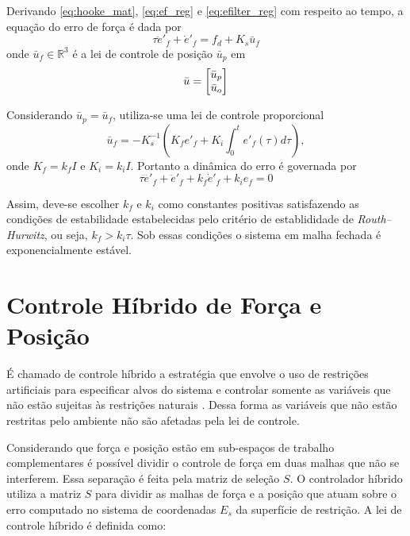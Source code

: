 Derivando \eqref{eq:hooke_mat}, \eqref{eq:ef_reg} e \eqref{eq:efilter_reg} com respeito ao tempo, a equação do erro de força é dada por 
\begin{equation}
\tau \ddot{e}'_{f} + \dot{e}'_f = {f}_d + K_s \bar{u}_f
\end{equation}
onde $\bar{u}_f \in \mathbb{R}^3$ é a lei de controle de posição $\bar{u}_p$ em
\begin{equation}
\bar{u} = \begin{bmatrix} \bar{u}_p \\ \bar{u}_o \end{bmatrix}
\end{equation}

Considerando $\bar{u}_p = \bar{u}_f$, utiliza-se uma lei de controle proporcional
\begin{equation} \label{eq:pi_force}
\bar{{u}}_f = -{K}_s^{-1} ({K}_f {e'}_f + {K}_i \int_0^t {e'}_f (\tau)d\tau),
\end{equation}
onde $K_f = k_f I$ e $K_i = k_i I$. Portanto a dinâmica do erro é governada por 
\begin{equation}
\tau \dddot{e}'_f + \ddot{e}'_f + k_f \dot{e}'_f + k_i e_f = 0
\end{equation}

Assim, deve-se escolher $k_f$ e $k_i$ como constantes positivas satisfazendo as condições de estabilidade estabelecidas pelo critério de establididade de \textit{Routh–Hurwitz}, ou seja, $k_f > k_i \tau$. Sob essas condições o sistema em malha fechada é exponencialmente estável.


\section{Controle Híbrido de Força e Posição}

É chamado de controle híbrido a estratégia que envolve o uso de restrições artificiais para especificar alvos do sistema e controlar somente as variáveis que não estão sujeitas às restrições naturais \citep{xaud2016doris}. Dessa forma as variáveis que não estão restritas pelo ambiente não são afetadas pela lei de controle.

Considerando que força e posição estão em sub-espaços de trabalho complementares é possível dividir o controle de força em duas malhas que não se interferem. Essa separação é feita pela matriz de seleção ${S}$. O controlador híbrido utiliza a matriz ${S}$ para dividir as malhas de  força e a posição  que atuam sobre o erro computado no sistema de coordenadas ${E}_s$ da superfície de restrição. A lei de controle híbrido é definida como:

